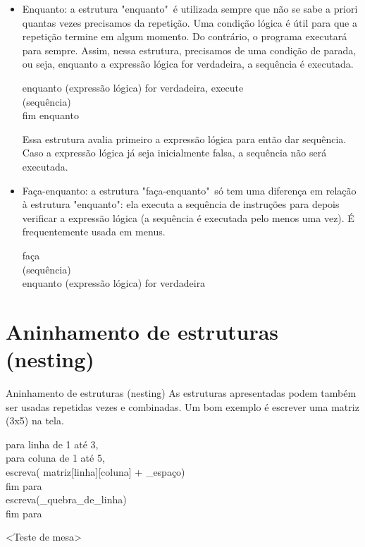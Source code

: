 \documentclass{beamer}%
\def\azul{\color{blue!90!black}}
\begin{document}
\begin{frame}
\begin{itemize}\justifying
\item Enquanto: a estrutura "enquanto"\ é utilizada sempre que não se
sabe a priori quantas vezes precisamos da repetição. Uma condição
lógica é útil para que a repetição termine em algum momento. Do
contrário, o programa executará para sempre. Assim, nessa estrutura,
precisamos de uma condição de parada, ou seja, enquanto a expressão
lógica for verdadeira, a sequência é executada.

{\azul
enquanto (expressão lógica) for verdadeira, execute\\
\qquad (sequência)\\
fim enquanto
}

Essa estrutura avalia primeiro a expressão lógica para então dar
sequência. Caso a expressão lógica já seja inicialmente falsa, a
sequência não será executada.
\end{itemize}
\end{frame}





\begin{frame}
\begin{itemize}\justifying
\item Faça-enquanto: a estrutura "faça-enquanto"\ só tem uma diferença em relação à
estrutura "enquanto": ela executa a sequência de instruções para
depois verificar a expressão lógica (a sequência é
executada pelo menos uma vez). É frequentemente usada em menus.

{\azul
faça\\
\qquad (sequência)\\
enquanto (expressão lógica) for verdadeira
}
\end{itemize}
\end{frame}

\section[Aninhamento]{Aninhamento de estruturas (nesting)}
\begin{frame}{Aninhamento de estruturas (nesting)}
As estruturas apresentadas podem também ser usadas repetidas vezes e
combinadas. Um bom exemplo é escrever uma matriz (3x5) na tela.

{\azul
para linha de 1 até 3,\\
\qquad para coluna de 1 até 5,\\
\qquad\qquad escreva( matriz[linha][coluna] + \_espaço)\\
\qquad fim para\\
\qquad escreva(\_quebra\_de\_linha)\\
fim para
}

<Teste de mesa>
\end{frame}
\end{document}
